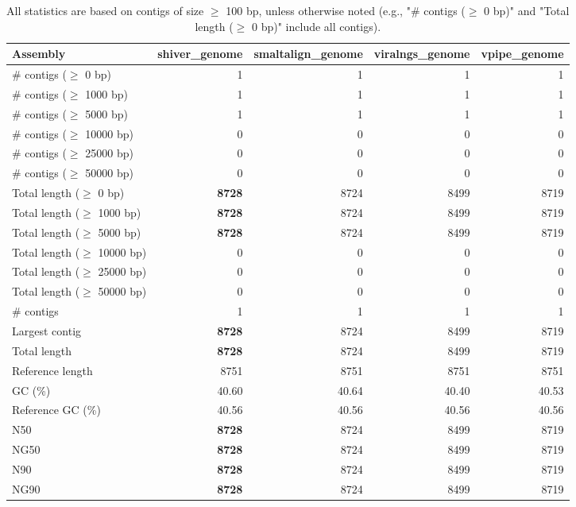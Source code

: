 \documentclass[12pt,a4paper]{article}
\begin{document}
\begin{table}[ht]
\begin{center}
\caption{All statistics are based on contigs of size $\geq$ 100 bp, unless otherwise noted (e.g., "\# contigs ($\geq$ 0 bp)" and "Total length ($\geq$ 0 bp)" include all contigs).}
\begin{tabular}{|l*{4}{|r}|}
\hline
Assembly & shiver\_genome & smaltalign\_genome & viralngs\_genome & vpipe\_genome \\ \hline
\# contigs ($\geq$ 0 bp) & 1 & 1 & 1 & 1 \\ \hline
\# contigs ($\geq$ 1000 bp) & 1 & 1 & 1 & 1 \\ \hline
\# contigs ($\geq$ 5000 bp) & 1 & 1 & 1 & 1 \\ \hline
\# contigs ($\geq$ 10000 bp) & 0 & 0 & 0 & 0 \\ \hline
\# contigs ($\geq$ 25000 bp) & 0 & 0 & 0 & 0 \\ \hline
\# contigs ($\geq$ 50000 bp) & 0 & 0 & 0 & 0 \\ \hline
Total length ($\geq$ 0 bp) & {\bf 8728} & 8724 & 8499 & 8719 \\ \hline
Total length ($\geq$ 1000 bp) & {\bf 8728} & 8724 & 8499 & 8719 \\ \hline
Total length ($\geq$ 5000 bp) & {\bf 8728} & 8724 & 8499 & 8719 \\ \hline
Total length ($\geq$ 10000 bp) & 0 & 0 & 0 & 0 \\ \hline
Total length ($\geq$ 25000 bp) & 0 & 0 & 0 & 0 \\ \hline
Total length ($\geq$ 50000 bp) & 0 & 0 & 0 & 0 \\ \hline
\# contigs & 1 & 1 & 1 & 1 \\ \hline
Largest contig & {\bf 8728} & 8724 & 8499 & 8719 \\ \hline
Total length & {\bf 8728} & 8724 & 8499 & 8719 \\ \hline
Reference length & 8751 & 8751 & 8751 & 8751 \\ \hline
GC (\%) & 40.60 & 40.64 & 40.40 & 40.53 \\ \hline
Reference GC (\%) & 40.56 & 40.56 & 40.56 & 40.56 \\ \hline
N50 & {\bf 8728} & 8724 & 8499 & 8719 \\ \hline
NG50 & {\bf 8728} & 8724 & 8499 & 8719 \\ \hline
N90 & {\bf 8728} & 8724 & 8499 & 8719 \\ \hline
NG90 & {\bf 8728} & 8724 & 8499 & 8719 \\ \hline

\end{tabular}
\end{center}
\end{table}
\end{document}

